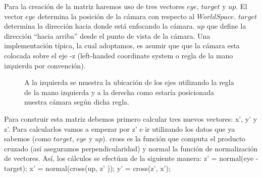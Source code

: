 \documentclass[a4paper]{article}
\newcounter{col}
\begin{document}
Para la creación de la matriz haremos uso de tres vectores $eye$, $target$ y $up$. El vector $eye$ determina la posición de la cámara con respecto al $World Space$. $target$ determina la dirección hacia donde está enfocando la cámara. $up$ que define la dirección ``hacia arriba'' desde el punto de vista de la cámara.  Una implementación típica, la cual adoptamos, es asumir que que la cámara esta colocada sobre el eje -z (left-handed coordinate system o regla de la mano izquierda por convención).
\begin{figure}[h!]
 \centering
  \caption{A la izquierda se muestra la ubicación de los ejes utilizando la regla de la mano izquierda y a la derecha como estaría posicionada nuestra cámara según dicha regla.}
 \label{f:coordenadas}
\end{figure}


Para construir esta matriz debemos primero calcular tres nuevos vectores: x', y' y z'. Para calcularlos vamos a empezar por z' e ir utilizando los datos que ya sabemos (como $target$, $eye$ y $up$). cross es la función que computa el producto cruzado (así aseguramos perpendicularidad) y normal la función de normalización de vectores. Así, los cálculos se efectúan de la siguiente manera: \newline \newline
    z'  = normal(eye - target); \newline 
    x' = normal(cross(up, z' )); \newline
    y' = cross(z', x');   \newline
    
\end{document}
